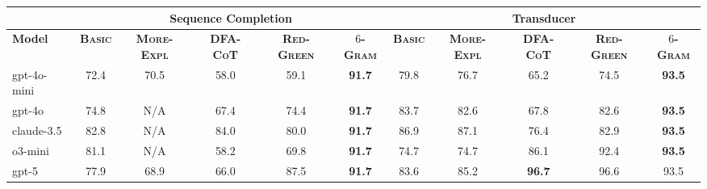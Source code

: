 {\renewcommand{\arraystretch}{1.25}\begin{tabular}{l|ccccc|ccccc}
\hline
  & \multicolumn{5}{c|}{\bf Sequence Completion} & \multicolumn{5}{c}{\bf Transducer} \\
\hline
\bf Model & \bf \textsc{Basic} & \bf \textsc{More-Expl} & \bf \textsc{DFA-CoT} & \bf \textsc{Red-Green} & \bf \textsc{$6$-Gram} & \bf \textsc{Basic} & \bf \textsc{More-Expl} & \bf \textsc{DFA-CoT} & \bf \textsc{Red-Green} & \bf \textsc{$6$-Gram} \\
\hline
gpt-4o-mini & 72.4 & \cellcolor{ecgreen!22} 70.5 & \cellcolor{evallmProp!18} 58.0 & \cellcolor{evallmProp!18} 59.1 & \bf 91.7 & 79.8 & \cellcolor{ecgreen!22} 76.7 & \cellcolor{evallmProp!18} 65.2 & \cellcolor{evallmProp!18} 74.5 & \bf 93.5 \\
\hline
gpt-4o & 74.8 & \cellcolor{ecgreen!22} N/A\footnotemark[1] & \cellcolor{evallmProp!18} 67.4 & \cellcolor{evallmProp!18} 74.4 & \bf 91.7 & 83.7 & \cellcolor{ecgreen!22} 82.6 & \cellcolor{evallmProp!18} 67.8 & \cellcolor{evallmProp!18} 82.6 & \bf 93.5 \\
\hline
claude-3.5 & 82.8 & \cellcolor{ecgreen!22} N/A\footnotemark[1] & \cellcolor{evallmProp!18} 84.0 & \cellcolor{evallmProp!18} 80.0 & \bf 91.7 & 86.9 & \cellcolor{ecgreen!22} 87.1 & \cellcolor{evallmProp!18} 76.4 & \cellcolor{evallmProp!18} 82.9 & \bf 93.5 \\
\hline
o3-mini & 81.1 & \cellcolor{ecgreen!22} N/A\footnotemark[1] & \cellcolor{evallmHighlight!22} 58.2 & \cellcolor{evallmHighlight!22} 69.8 & \bf 91.7 & 74.7 & \cellcolor{ecgreen!22} 74.7 & \cellcolor{evallmHighlight!22} 86.1 & \cellcolor{evallmHighlight!22} 92.4 & \bf 93.5 \\
\hline
gpt-5 & 77.9 & \cellcolor{ecgreen!22} 68.9 & \cellcolor{ecblue!22} 66.0 & \cellcolor{ecblue!22} 87.5 & \bf 91.7 & 83.6 & \cellcolor{ecgreen!22} 85.2 & \cellcolor{ecblue!22} \bf 96.7 & \cellcolor{ecblue!22} 96.6 & 93.5 \\
\hline
\end{tabular}
}
